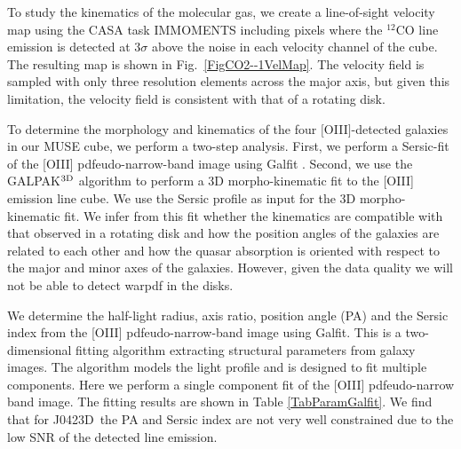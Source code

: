 \documentclass[a4paper,fleqn,usenatbib]{mnras}
\newcommand{\GalD}{J0423D}
\begin{document}
{To study the kinematics of the molecular gas, we create a line-of-sight velocity map using the CASA task {\sc IMMOMENTS} including pixels where the $^{12}$CO line emission is detected at $3\sigma$ above the noise in each velocity channel of the cube. The resulting map is shown in Fig.~\ref{FigCO2--1VelMap}. The velocity field is sampled with only three resolution elements across the major axis, but given this limitation, the velocity field is consistent with that of a rotating disk.\\


\label{SecGalfit}

To determine the morphology and kinematics of the four $[$OIII$]$-detected galaxies in our MUSE cube, we perform a two-step analysis. First, we perform a Sersic-fit of the [OIII] pdfeudo-narrow-band image using {\sc Galfit} \mbox{\citep{Peng2002detailed}}. Second, we use the {\sc GALPAK$^{\rm 3D}$} algorithm \mbox{\citep{Bouche2015galpak}} to perform a 3D morpho-kinematic fit to the [OIII] emission line cube. We use the Sersic profile as input for the 3D morpho-kinematic fit. We infer from this fit whether the kinematics are compatible with that observed in a rotating disk and how the position angles of the galaxies are related to each other and how the quasar absorption is oriented with respect to the major and minor axes of the galaxies. However, given the data quality we will not be able to detect warpdf in the disks.

We determine the half-light radius, axis ratio, position angle (PA) and the Sersic index from the [OIII] pdfeudo-narrow-band image using {\sc Galfit}. This is a two-dimensional fitting algorithm extracting structural parameters from galaxy images. The algorithm models the light profile and is designed to fit multiple components. Here we perform a single component fit of the [OIII] pdfeudo-narrow band image. The fitting results are shown in Table \mbox{\ref{TabParamGalfit}}. We find that for \GalD\ the PA and Sersic index are not very well constrained due to the low SNR of the detected line emission.


}
\end{document}
